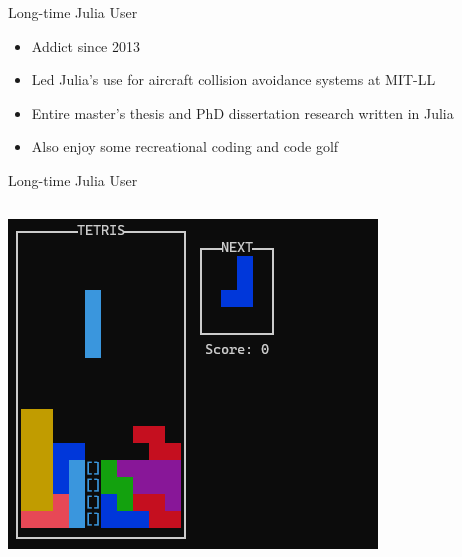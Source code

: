 \begin{frame}[fragile]{Long-time Julia User} \pause

\begin{itemize}
  \item Addict since 2013 \pause
  \item Led Julia's use for aircraft collision avoidance systems at MIT-LL \pause
  \item Entire master's thesis and PhD dissertation research written in Julia \pause
  \item Also enjoy some recreational coding and code golf
\end{itemize}

\end{frame}


\begin{frame}[fragile]{Long-time Julia User}

\begin{columns}

  \begin{column}{0.45\textwidth}
    \centering
    \includegraphics[width=\linewidth]{media/tetris.png}
    
  \end{column}

  \pause


\end{columns}
\end{frame}

